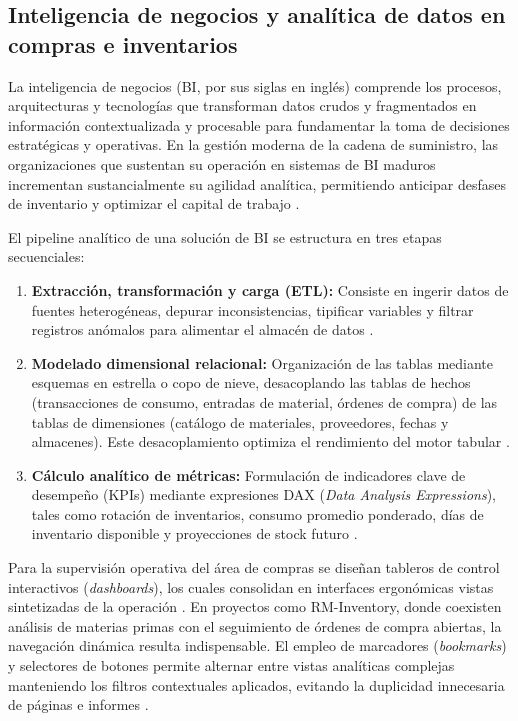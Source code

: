 \subsection{Inteligencia de negocios y analítica de datos en compras e inventarios}

La inteligencia de negocios (BI, por sus siglas en inglés) comprende los procesos, arquitecturas y tecnologías que transforman datos crudos y fragmentados en información contextualizada y procesable para fundamentar la toma de decisiones estratégicas y operativas. En la gestión moderna de la cadena de suministro, las organizaciones que sustentan su operación en sistemas de BI maduros incrementan sustancialmente su agilidad analítica, permitiendo anticipar desfases de inventario y optimizar el capital de trabajo \cite{popovic2012bi, wixom2010bi}.

El pipeline analítico de una solución de BI se estructura en tres etapas secuenciales:
\begin{enumerate}
    \item \textbf{Extracción, transformación y carga (ETL):} Consiste en ingerir datos de fuentes heterogéneas, depurar inconsistencias, tipificar variables y filtrar registros anómalos para alimentar el almacén de datos \cite{microsoft2025pbiTransform}.
    \item \textbf{Modelado dimensional relacional:} Organización de las tablas mediante esquemas en estrella o copo de nieve, desacoplando las tablas de hechos (transacciones de consumo, entradas de material, órdenes de compra) de las tablas de dimensiones (catálogo de materiales, proveedores, fechas y almacenes). Este desacoplamiento optimiza el rendimiento del motor tabular \cite{sharda2020analytics}.
    \item \textbf{Cálculo analítico de métricas:} Formulación de indicadores clave de desempeño (KPIs) mediante expresiones DAX (\emph{Data Analysis Expressions}), tales como rotación de inventarios, consumo promedio ponderado, días de inventario disponible y proyecciones de stock futuro \cite{microsoft2025pbiTransform}.
\end{enumerate}

Para la supervisión operativa del área de compras se diseñan tableros de control interactivos (\emph{dashboards}), los cuales consolidan en interfaces ergonómicas vistas sintetizadas de la operación \cite{microsoft2025pbiDashboards}. En proyectos como RM-Inventory, donde coexisten análisis de materias primas con el seguimiento de órdenes de compra abiertas, la navegación dinámica resulta indispensable. El empleo de marcadores (\emph{bookmarks}) y selectores de botones permite alternar entre vistas analíticas complejas manteniendo los filtros contextuales aplicados, evitando la duplicidad innecesaria de páginas e informes \cite{microsoft2025pbiMarcadores, microsoft2025pbiBookmarks}.

